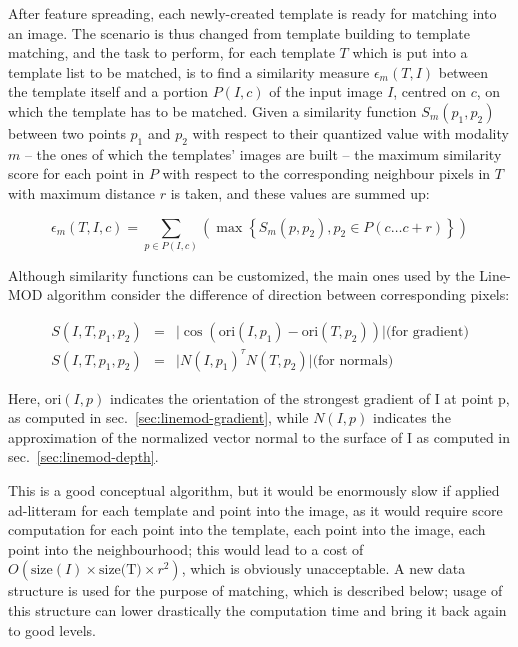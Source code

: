 After feature spreading, each newly-created template is ready for
matching into an image. The scenario is thus changed from template
building to template matching, and the task to perform, for each
template $T$ which is put into a template list to be matched, is to
find a similarity measure $\epsilon_m (T,I)$ between the template itself
and a portion $P(I,c)$ of
the input image $I$, centred on $c$, on which the template has to be matched. Given a
similarity function $S_m(p_1, p_2)$ between two points $p_1$ and $p_2$
with respect to their quantized value with modality $m$ -- the ones
of which the templates' images are built -- the maximum similarity
score for each point in $P$ with respect to the corresponding
neighbour pixels in $T$ with maximum distance $r$ is taken, and these values are summed up:

\begin{equation} \label{eqn:similarity-function}
  \epsilon_m (T,I,c)=\sum_{p\in P(I,c)} { \left( \max \left\{ S_m
      (p,p_2) , p_2 \in P(c\dots c+r) \right\} \right) }
\end{equation}

Although similarity functions can be customized, the main ones used
by the Line-MOD algorithm consider the difference of direction between
corresponding pixels:

\begin{eqnarray}
  S(I,T,p_1,p_2) & = & \lvert \cos(\text{ori}(I,p_1) -
  \text{ori}(T,p_2)) \rvert \text{(for gradient)} \\
  S(I,T,p_1,p_2) & = & \lvert N(I,p_1)^{\tau} N(T,p_2)\rvert \text{(for normals)}
\end{eqnarray}

Here, $\text{ori}(I,p)$ indicates the orientation of the strongest
gradient of I at point p, as computed in
sec.~\ref{sec:linemod-gradient}, while $N(I,p)$ indicates the
approximation of the normalized vector normal to the surface of I as
computed in sec.~\ref{sec:linemod-depth}.

This is a good conceptual algorithm, but it would be enormously slow
if applied ad-litteram for each template and point into the image, as
it would require score computation for each point into the template,
each point into the image, each point into the neighbourhood; this
would lead to a cost of $O(\text{size}(I)\times \text{size(T)}\times
r^2)$, which is obviously unacceptable. A new data structure is used for
the purpose of matching, which is described below; usage of this
structure can lower drastically the computation time and bring it back
again to good levels.

